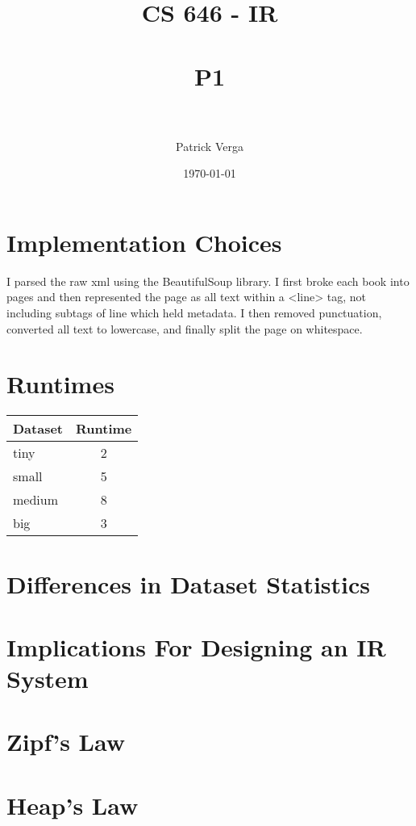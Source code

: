 \documentclass[paper=a4, fontsize=11pt]{scrartcl} %
\title{	
\normalfont \normalsize 
\textsc{CS 646 - IR} \\ [25pt] %
\horrule{0.5pt} \\[0.4cm] %
\huge P1 \\ %
\horrule{2pt} \\[0.5cm] %
}
\author{Patrick Verga} %
\date{\normalsize\today} %
\numberwithin{equation}{section} %
\numberwithin{figure}{section} %
\numberwithin{table}{section} %
\begin{document}
\maketitle %


\section {Implementation Choices}

I parsed the raw xml using the BeautifulSoup library. I first broke each book into pages and then represented the page as all text within a <line> tag, not including subtags of line which held metadata. I then removed punctuation, converted all text to lowercase, and finally split the page on whitespace.


\section {Runtimes}

\begin{tabular}{ l | c }
Dataset & Runtime \\
\hline
  tiny & 2  \\
  small & 5  \\
  medium & 8  \\
  big & 3  \\
\end{tabular}

\section {Differences in Dataset Statistics}


\section {Implications For Designing an IR System}


\section{Zipf's Law}


\section{Heap's Law}
\end{document}
